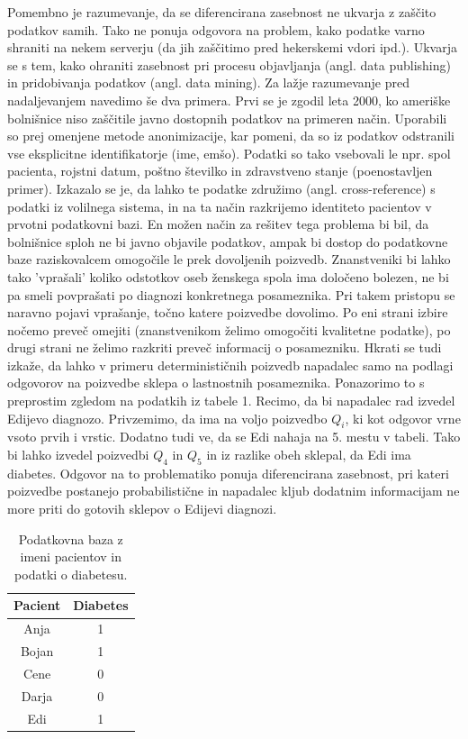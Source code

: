 \documentclass[12pt,a4paper]{amsart}
\theoremstyle{definition} %
\theoremstyle{plain} %
\begin{document}
Pomembno je razumevanje, da se diferencirana zasebnost ne ukvarja z zaščito podatkov samih. Tako ne ponuja odgovora na problem, kako podatke varno shraniti na nekem serverju (da jih zaščitimo pred hekerskemi vdori ipd.). Ukvarja se s tem, kako ohraniti zasebnost pri procesu objavljanja (angl. data publishing) in pridobivanja podatkov (angl. data mining). Za lažje razumevanje pred nadaljevanjem navedimo še dva primera. Prvi se je zgodil leta 2000, ko ameriške bolnišnice niso zaščitile javno dostopnih podatkov na primeren način. Uporabili so prej omenjene metode anonimizacije, kar pomeni, da so iz podatkov odstranili vse eksplicitne identifikatorje (ime, emšo). Podatki so tako vsebovali le npr. spol pacienta, rojstni datum, poštno številko in zdravstveno stanje (poenostavljen primer). Izkazalo se je, da lahko te podatke združimo (angl. cross-reference) s podatki iz volilnega sistema, in na ta način razkrijemo identiteto pacientov v prvotni podatkovni bazi. En možen način za rešitev tega problema bi bil, da bolnišnice sploh ne bi javno objavile podatkov, ampak bi dostop do podatkovne baze raziskovalcem omogočile le prek dovoljenih poizvedb. Znanstveniki bi lahko tako 'vprašali' koliko odstotkov oseb ženskega spola ima določeno bolezen, ne bi pa smeli povprašati po diagnozi konkretnega posameznika. Pri takem pristopu se naravno pojavi vprašanje, točno katere poizvedbe dovolimo. Po eni strani izbire nočemo preveč omejiti (znanstvenikom želimo omogočiti kvalitetne podatke), po drugi strani ne želimo razkriti preveč informacij o posamezniku. Hkrati se tudi izkaže, da lahko v primeru determinističnih poizvedb napadalec samo na podlagi odgovorov na poizvedbe sklepa o lastnostnih posameznika. Ponazorimo to s preprostim zgledom na podatkih iz tabele 1. Recimo, da bi napadalec rad izvedel Edijevo diagnozo. Privzemimo, da ima na voljo poizvedbo $Q_i$, ki kot odgovor vrne vsoto prvih i vrstic. Dodatno tudi ve, da se Edi nahaja na 5. mestu v tabeli. Tako bi lahko izvedel poizvedbi $Q_4$ in $Q_5$ in iz razlike obeh sklepal, da Edi ima diabetes.  Odgovor na to problematiko ponuja diferencirana zasebnost, pri kateri poizvedbe postanejo probabilistične in napadalec kljub dodatnim informacijam ne more priti do gotovih sklepov o Edijevi diagnozi.
\begin{table}
\begin{center}
 \begin{tabular}{| c | c |} 
 \hline
 \textbf{Pacient} & \textbf{Diabetes}  \\ [0.5ex] 
 \hline
 Anja & 1  \\ 
 \hline
 Bojan & 1\\
 \hline
 Cene & 0 \\
 \hline
 Darja & 0  \\
 \hline
 Edi & 1  \\  
 \hline
\end{tabular}
\caption{Podatkovna baza z imeni pacientov in podatki o diabetesu.}
\end{center}
\end{table}
\end{document}
